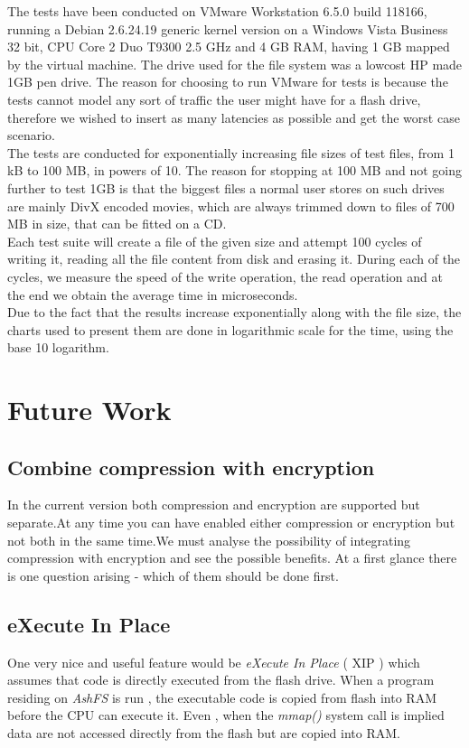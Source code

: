 \documentclass[conference]{IEEEtran}
\begin{document}
The tests have been conducted on VMware Workstation 6.5.0 build 118166, running a Debian 2.6.24.19 generic kernel version on a
Windows Vista Business 32 bit, CPU Core 2 Duo T9300 2.5 GHz and 4 GB RAM, having 1 GB mapped by the virtual machine. The drive used
for the file system was a lowcost HP made 1GB pen drive. The reason for choosing to run VMware for tests is because the tests
cannot model any sort of traffic the user might have for a flash drive, therefore we wished to insert as many latencies as possible
and get the worst case scenario.\\

The tests are conducted for exponentially increasing file sizes of test files, from 1 kB to 100 MB, in powers of 10. The reason
for stopping at 100 MB and not going further to test 1GB is that the biggest files a normal user stores on such drives are mainly
DivX encoded movies, which are always trimmed down to files of 700 MB in size, that can be fitted on a CD.\\

Each test suite will create a file of the given size and attempt 100 cycles of writing it, reading all the file content from disk
and erasing it. During each of the cycles, we measure the speed of the write operation, the read operation and at the end we
obtain the average time in microseconds.\\

Due to the fact that the results increase exponentially along with the file size, the charts used to present them are done in 
logarithmic scale for the time, using the base 10 logarithm.


\section{Future Work}



\subsection{Combine compression with encryption}
In the current version both compression and encryption are supported but separate.At any time you can have 
enabled either compression or encryption but not both in the same time.We must analyse the possibility of 
integrating compression with encryption and see the possible benefits. At a first glance there is one question arising - which of them should be 
done first. 
\subsection{eXecute In Place}
One very nice and useful feature would be {\em eXecute In Place} ( XIP ) which assumes that code is
directly executed from the flash drive. When a program residing on {\em AshFS } is run , the executable
code is copied from flash into RAM before the CPU can execute it. Even , when the {\em mmap() } system 
call is implied data are not accessed directly from the flash but are copied into RAM. \\
\end{document}

